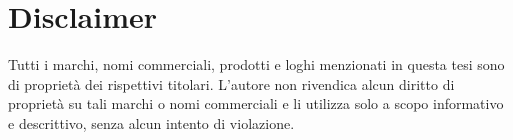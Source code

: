 \chapter*{Disclaimer}
Tutti i marchi, nomi commerciali, prodotti e loghi menzionati in questa tesi sono di proprietà dei rispettivi titolari. L'autore non rivendica alcun diritto di proprietà su tali marchi o nomi commerciali e li utilizza solo a scopo informativo e descrittivo, senza alcun intento di violazione.